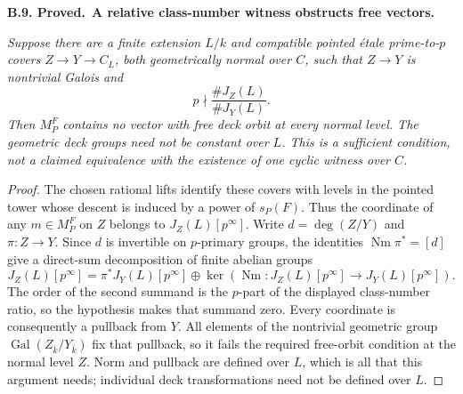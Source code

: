 \documentclass[11pt,a4paper]{article}
\newcommand{\Gal}{\operatorname{Gal}}
\newenvironment{claim}[3]{\par\medskip\noindent\hypertarget{#1}{\textbf{#1. #2.}}\ \textbf{#3.}\par\nopagebreak\smallskip\begingroup\itshape}{\endgroup\par\smallskip}
\begin{document}
\begin{claim}{B.9}{Proved}{A relative class-number witness obstructs free vectors}
Suppose there are a finite extension $L/k$ and compatible pointed
étale prime-to-$p$ covers $Z\to Y\to C_L$, both geometrically
normal over $C$, such that $Z\to Y$ is nontrivial Galois and
\[
                           p\nmid\frac{\#J_Z(L)}{\#J_Y(L)}.
\]
Then $M_P^F$ contains no vector with free deck orbit at every
normal level. The geometric deck groups need not be constant over
$L$. This is a sufficient condition, not a claimed equivalence
with the existence of one cyclic witness over $C$.
\end{claim}
\begin{proof}
The chosen rational lifts identify these covers with levels in the
pointed tower whose descent is induced by a power of $s_P(F)$.
Thus the coordinate of any $m\in M_P^F$ on $Z$ belongs to
$J_Z(L)[p^\infty]$. Write $d=\deg(Z/Y)$ and
$\pi:Z\to Y$. Since $d$ is invertible on $p$-primary groups,
the identities $\operatorname{Nm}\pi^*=[d]$ give a direct-sum
decomposition of finite abelian groups
\[
 J_Z(L)[p^\infty]
 =\pi^*J_Y(L)[p^\infty]\oplus
       \ker\!\left(\operatorname{Nm}:J_Z(L)[p^\infty]
                                  \to J_Y(L)[p^\infty]\right).
\]
The order of the second summand is the $p$-part of the displayed
class-number ratio, so the hypothesis makes that summand zero.
Every coordinate is consequently a pullback from $Y$. All elements
of the nontrivial geometric group $\Gal(Z_{\bar k}/Y_{\bar k})$
fix that pullback, so it fails the required free-orbit condition
at the normal level $Z$. Norm and pullback are defined over $L$,
which is all that this argument needs; individual deck
transformations need not be defined over $L$.
\end{proof}
\end{document}
